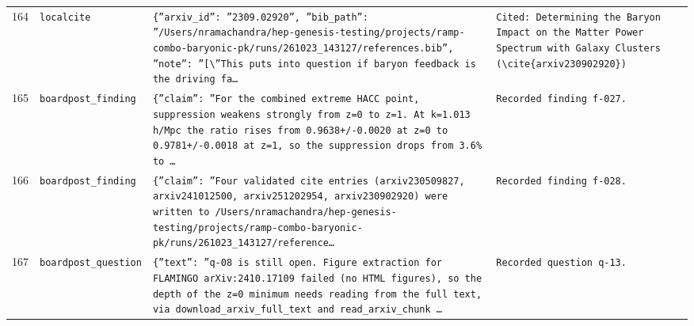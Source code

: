 \documentclass[11pt,a4paper]{article}
\begin{document}
\begin{longtable}{@{}p{}p{}p{}p{}@{}}
164 & \texttt{local}\newline\texttt{cite} & \texttt{\{''arxiv\_\allowbreak{}id'':\allowbreak{} ''2309.02920'',\allowbreak{} ''bib\_\allowbreak{}path'':\allowbreak{} ''/\allowbreak{}Users/\allowbreak{}nramachandra/\allowbreak{}hep-genesis-testing/\allowbreak{}projects/\allowbreak{}ramp-combo-baryonic-pk/\allowbreak{}runs/\allowbreak{}261023\_\allowbreak{}143127/\allowbreak{}references.bib'',\allowbreak{} ''note'':\allowbreak{} ''[\textbackslash{}\allowbreak{}''This puts into question if baryon feedback is the driving fa\ldots{}\allowbreak{}} & \texttt{Cited:\allowbreak{} Determining the Baryon Impact on the Matter Power Spectrum with Galaxy Clusters (\textbackslash{}\allowbreak{}cite\{arxiv230902920\}\allowbreak{})\allowbreak{}} \\
165 & \texttt{board}\newline\texttt{post\_\allowbreak{}finding} & \texttt{\{''claim'':\allowbreak{} ''For the combined extreme HACC point,\allowbreak{} suppression weakens strongly from z=\allowbreak{}0 to z=\allowbreak{}1. At k=\allowbreak{}1.013 h/\allowbreak{}Mpc the ratio rises from 0.9638+/\allowbreak{}-0.0020 at z=\allowbreak{}0 to 0.9781+/\allowbreak{}-0.0018 at z=\allowbreak{}1,\allowbreak{} so the suppression drops from 3.6\% to \ldots{}\allowbreak{}} & \texttt{Recorded finding f-027.} \\
166 & \texttt{board}\newline\texttt{post\_\allowbreak{}finding} & \texttt{\{''claim'':\allowbreak{} ''Four validated cite entries (arxiv230509827,\allowbreak{} arxiv241012500,\allowbreak{} arxiv251202954,\allowbreak{} arxiv230902920)\allowbreak{} were written to /\allowbreak{}Users/\allowbreak{}nramachandra/\allowbreak{}hep-genesis-testing/\allowbreak{}projects/\allowbreak{}ramp-combo-baryonic-pk/\allowbreak{}runs/\allowbreak{}261023\_\allowbreak{}143127/\allowbreak{}reference\ldots{}\allowbreak{}} & \texttt{Recorded finding f-028.} \\
167 & \texttt{board}\newline\texttt{post\_\allowbreak{}question} & \texttt{\{''text'':\allowbreak{} ''q-08 is still open. Figure extraction for FLAMINGO arXiv:\allowbreak{}2410.17109 failed (no HTML figures)\allowbreak{},\allowbreak{} so the depth of the z=\allowbreak{}0 minimum needs reading from the full text,\allowbreak{} via download\_\allowbreak{}arxiv\_\allowbreak{}full\_\allowbreak{}text and read\_\allowbreak{}arxiv\_\allowbreak{}chunk \ldots{}\allowbreak{}} & \texttt{Recorded question q-13.} \\

\end{longtable}
\end{document}
